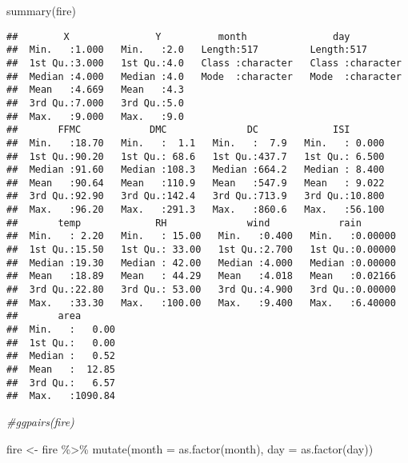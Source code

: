 \documentclass[
]{article}
\newenvironment{Shaded}{\begin{snugshade}}{\end{snugshade}}
\newcommand{\AttributeTok}[1]{\textcolor[rgb]{0.77,0.63,0.00}{#1}}
\newcommand{\CommentTok}[1]{\textcolor[rgb]{0.56,0.35,0.01}{\textit{#1}}}
\newcommand{\FunctionTok}[1]{\textcolor[rgb]{0.00,0.00,0.00}{#1}}
\newcommand{\NormalTok}[1]{#1}
\newcommand{\OtherTok}[1]{\textcolor[rgb]{0.56,0.35,0.01}{#1}}
\newcommand{\SpecialCharTok}[1]{\textcolor[rgb]{0.00,0.00,0.00}{#1}}
\begin{document}
\begin{Shaded}
\begin{Highlighting}[]
\FunctionTok{summary}\NormalTok{(fire)}
\end{Highlighting}
\end{Shaded}

\begin{verbatim}
##        X               Y          month               day           
##  Min.   :1.000   Min.   :2.0   Length:517         Length:517        
##  1st Qu.:3.000   1st Qu.:4.0   Class :character   Class :character  
##  Median :4.000   Median :4.0   Mode  :character   Mode  :character  
##  Mean   :4.669   Mean   :4.3                                        
##  3rd Qu.:7.000   3rd Qu.:5.0                                        
##  Max.   :9.000   Max.   :9.0                                        
##       FFMC            DMC              DC             ISI        
##  Min.   :18.70   Min.   :  1.1   Min.   :  7.9   Min.   : 0.000  
##  1st Qu.:90.20   1st Qu.: 68.6   1st Qu.:437.7   1st Qu.: 6.500  
##  Median :91.60   Median :108.3   Median :664.2   Median : 8.400  
##  Mean   :90.64   Mean   :110.9   Mean   :547.9   Mean   : 9.022  
##  3rd Qu.:92.90   3rd Qu.:142.4   3rd Qu.:713.9   3rd Qu.:10.800  
##  Max.   :96.20   Max.   :291.3   Max.   :860.6   Max.   :56.100  
##       temp             RH              wind            rain        
##  Min.   : 2.20   Min.   : 15.00   Min.   :0.400   Min.   :0.00000  
##  1st Qu.:15.50   1st Qu.: 33.00   1st Qu.:2.700   1st Qu.:0.00000  
##  Median :19.30   Median : 42.00   Median :4.000   Median :0.00000  
##  Mean   :18.89   Mean   : 44.29   Mean   :4.018   Mean   :0.02166  
##  3rd Qu.:22.80   3rd Qu.: 53.00   3rd Qu.:4.900   3rd Qu.:0.00000  
##  Max.   :33.30   Max.   :100.00   Max.   :9.400   Max.   :6.40000  
##       area        
##  Min.   :   0.00  
##  1st Qu.:   0.00  
##  Median :   0.52  
##  Mean   :  12.85  
##  3rd Qu.:   6.57  
##  Max.   :1090.84
\end{verbatim}

\begin{Shaded}
\begin{Highlighting}[]
\CommentTok{\#ggpairs(fire)}
\end{Highlighting}
\end{Shaded}

\begin{Shaded}
\begin{Highlighting}[]
\NormalTok{fire }\OtherTok{\textless{}{-}}\NormalTok{ fire }\SpecialCharTok{\%\textgreater{}\%} \FunctionTok{mutate}\NormalTok{(}\AttributeTok{month =} \FunctionTok{as.factor}\NormalTok{(month),}
                \AttributeTok{day =} \FunctionTok{as.factor}\NormalTok{(day))}
\end{Highlighting}
\end{Shaded}
\end{document}
